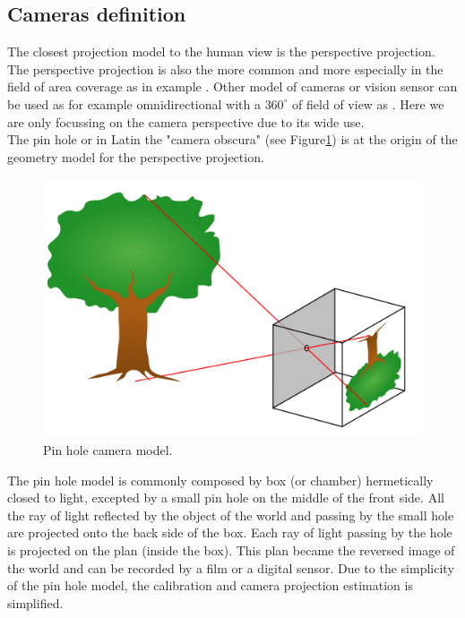 \subsection{ Cameras definition}\label{sec:CamerasDefinition}

The closest projection model to the human view is the perspective projection. The perspective projection is also the more common and more especially in the field of area coverage as in example \cite{101*topcuoglu2009,33*reddy2012,8*zhou2011,82*chrysostomou2012,22*zhao2008}. Other model of cameras or vision sensor can be used as for example omnidirectional with a $360^{\circ}$ of field of view as \citep{43*erdem2006,150*chakrabarty2002,174*zhang2016}. 
Here we are only focussing  on the camera perspective due to its wide use.  \\

The pin hole or in Latin the "camera obscura" (see Figure\ref{fig:cameraObscura}) is at the origin of the geometry model for the perspective projection.\\
\begin{figure}[t!]
\begin{center}
   \includegraphics[width=\linewidth]{img/PinholeCam.png}
  \caption{ Pin hole camera model.}\label{fig:cameraObscura}
  \endminipage\hfill
\end{center}
\end{figure} 
 The pin hole model is commonly composed by box (or chamber) hermetically closed to light, excepted by a small pin hole on the middle of the front side. All the ray of light reflected by the object of the world and passing by the small hole are projected onto the back side of the box. Each ray of light passing by the hole is  projected on the plan (inside the box). This plan became the reversed image of the world and can be recorded by a film or a digital sensor. 
 Due to the simplicity of the pin hole model, the calibration and camera projection estimation is simplified.\\
  
